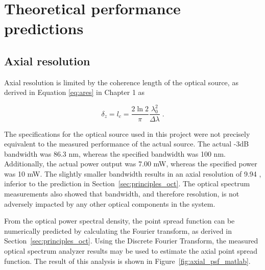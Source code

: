 \section{Theoretical performance predictions}
\label{sec:theory_res}

\subsection{Axial resolution}
\label{sec:axial_res}

Axial resolution is limited by the coherence length of the optical source, as derived in Equation \ref{eq:ares} in Chapter 1 as

\begin{equation} \label{eq:ares2}
\delta_z = l_c = \frac{2 \ln{2}}{\pi} \frac{\lambda_0^2}{\Delta \lambda} \; .
\end{equation}

The specifications for the optical source used in this project were not precisely equivalent to the measured performance of the actual source. The actual -3dB bandwidth was 86.3 nm, whereas the specified bandwidth was 100 nm. Additionally, the actual power output was 7.00 mW, whereas the specified power was 10 mW. The slightly smaller bandwidth results in an axial resolution of 9.94 \micron, inferior to the prediction in Section~\ref{sec:principles_oct}. The optical spectrum measurements also showed that bandwidth, and therefore resolution, is not adversely impacted by any other optical components in the system. %


From the optical power spectral density, the point spread function can be numerically predicted by calculating the Fourier transform, as derived in Section~\ref{sec:principles_oct}. Using the Discrete Fourier Transform, the measured optical spectrum analyzer results may be used to estimate the axial point spread function. The result of this analysis is shown in Figure~\ref{fig:axial_psf_matlab}.

